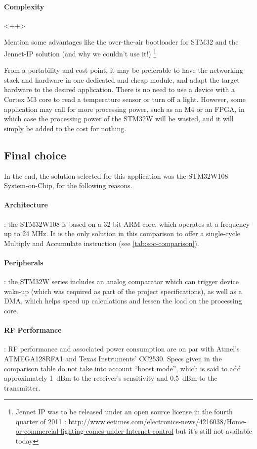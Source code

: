\paragraph{Complexity} 
<++>


Mention some advantages like the over-the-air bootloader for STM32 and the
Jennet-IP solution (and why we couldn't use it!) \footnote{Jennet IP was to be
released under an open source license in the fourth quarter of 2011
: \url{http://www.eetimes.com/electronics-news/4216038/Home-or-commercial-lighting-comes-under-Internet-control}
but it's still not available today}



From a portability and cost point, it may be preferable to have the networking
stack and hardware in one dedicated and cheap module, and adapt the target
hardware to the desired application. There is no need to use a device with
a Cortex M3 core to read a temperature sensor or turn off a light. However, some
application may call for more processing power, such as an M4 or an FPGA, in
which case the processing power of the STM32W will be wasted, and it will simply
be added to the cost for nothing.

\subsection{Final choice}

In the end, the solution selected for this application was the STM32W108
System-on-Chip, for the following reasons.

\paragraph{Architecture} : the STM32W108 is based on a 32-bit ARM core, which
operates at a frequency up to 24 MHz. It is the only solution in this comparison
to offer a single-cycle Multiply and Accumulate instruction (see
\autoref{tab:soc-comparison}).

\paragraph{Peripherals} : the STM32W series includes an analog comparator which
can trigger device wake-up (which was required as part of the project
specifications), as well as a \ac{DMA}, which helps speed up calculations and
lessen the load on the processing core.

\paragraph{RF Performance} : RF performance and associated power consumption are
on par with Atmel's ATMEGA128RFA1 and Texas Instruments' CC2530. Specs given in
the comparison table do not take into account ``boost mode'', which is said to
add approximately \SI{1}{dBm} to the receiver's sensitivity and \SI{0.5}{dBm} to
the transmitter.


